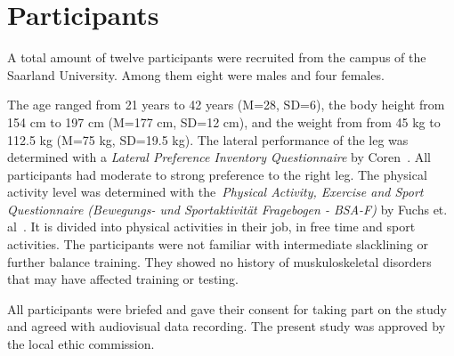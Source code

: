\section{Participants}\label{6_participants}
A total amount of twelve participants were recruited from the campus of the Saarland University.
Among them eight were males and four females.

The age ranged from 21 years to 42 years (M=28, SD=6), the body height from 154 cm to 197 cm (M=177 cm, SD=12 cm), and the weight from from 45 kg to 112.5 kg (M=75 kg, SD=19.5 kg).
The lateral performance of the leg was determined with a \textit{Lateral Preference Inventory Questionnaire} by Coren~\cite{Coren1993-lp}.
All participants had moderate to strong preference to the right leg.
The physical activity level was determined with the~\textit{Physical Activity, Exercise and Sport Questionnaire (Bewegungs- und Sportaktivität Fragebogen - BSA-F)} by Fuchs et. al~\cite{Fuchs2015-bsa}.
It is divided into physical activities in their job, in free time and sport activities.
The participants were not familiar with intermediate slacklining or further balance training. They showed no history of muskuloskeletal disorders that may have affected training or testing.

All participants were briefed and gave their consent for taking part on the study and agreed with audiovisual data recording.
The present study was approved by the local ethic commission.

